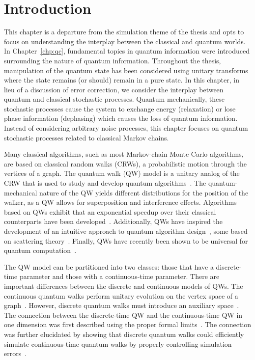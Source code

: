 \documentclass[11pt,oneside,final]{huthesis}%
\begin{document}
\section{Introduction}

This chapter is a departure from the simulation theme of the thesis and opts to focus on understanding the interplay between the classical and quantum worlds. In Chapter~\ref{chp:qc}, fundamental topics in quantum information were introduced surrounding the nature of quantum information.  Throughout the thesis, manipulation of the quantum state has been considered using unitary transforms where the state remains (or should) remain in a pure state.  In this chapter, in lieu of a discussion of error correction, we consider the interplay between quantum and classical stochastic processes. Quantum mechanically, these stochastic processes cause the system to exchange energy (relaxation) or lose phase information (dephasing) which causes the loss of quantum information.  Instead of considering arbitrary noise processes, this chapter focuses on quantum stochastic processes related to classical Markov chains.

Many classical algorithms, such as most Markov-chain Monte Carlo
algorithms, are based on classical random walks (CRWs), a probabilistic motion through the vertices of a graph. The quantum walk (QW) model is a unitary analog of the CRW that is
used to study and develop quantum algorithms~\cite{Aharonov01,Farhi98,Venegas08,Konno08,Ambainis08}. The quantum-mechanical nature
of the QW yields different distributions for the position of the
walker, as a QW allows for superposition and interference effects. 
Algorithms based on QWs exhibit that an exponential
speedup over their classical counterparts have been
developed~\cite{Childs02,Watrous01,Childs03}. Additionally, QWs have inspired the
development of an intuitive approach to quantum algorithm design~\cite{Shenvi03}, some based
on scattering theory~\cite{Farhi08}. Finally, QWs have recently been
shown to be universal for quantum computation~\cite{Childs09a}.

The QW model can be partitioned into two classes: those that have a discrete-time parameter and those with a continuous-time parameter.  There are important differences between the discrete and continuous models of QWs.  The continuous quantum walks perform unitary evolution on the vertex space of a graph~\cite{Farhi98}.  However, discrete quantum walks must introduce an auxiliary space~\cite{Aharonov93,Meyer96}.  The connection between the discrete-time QW and the continuous-time QW in one dimension was first described using the proper formal limits~\cite{Strauch06}.  The connection was further elucidated by showing that discrete quantum walks could efficiently simulate continuous-time quantum walks by properly controlling simulation errors~\cite{Childs09}. 
\end{document}
